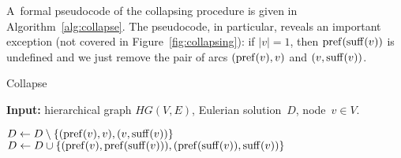 A~formal pseudocode of the collapsing procedure is given in Algorithm~\ref{alg:collapse}. The pseudocode, in particular, reveals an important exception (not covered in Figure~\ref{fig:collapsing}):
if $|v|=1$, then $\operatorname{pref}(\operatorname{suff}(v))$ is undefined and we just remove the pair of arcs $(\operatorname{pref}(v), v)$ and $(v, \operatorname{suff}(v))$.






\begin{algorithm}[!ht]
\caption{Collapse}\label{alg:collapse}
\hspace*{\algorithmicindent} \textbf{Input:} hierarchical graph $HG(V,E)$, Eulerian solution~$D$, node~$v \in V$.
\begin{algorithmic}[1]
\State\label{alg:col} $D \gets D \setminus \{(\operatorname{pref}(v), v), (v, \operatorname{suff}(v))\}$
\State $D \gets D \cup \{(\operatorname{pref}(v), \operatorname{pref}(\operatorname{suff}(v))), (\operatorname{pref}(\operatorname{suff}(v)), \operatorname{suff}(v))\}$
\EndIf
\EndIf
\end{algorithmic}
\end{algorithm}

